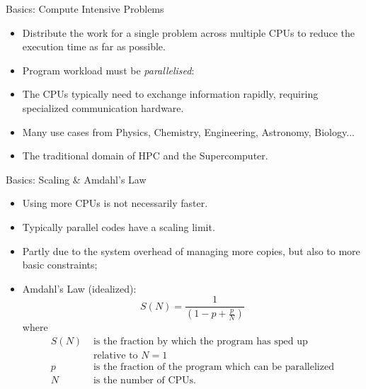 \begin{frame}{Basics: Compute Intensive Problems}
\begin{itemize}
\item{Distribute the \alert{work} for a \alert{single problem} across multiple CPUs to reduce the execution time as far as possible.}
\pause
\item{Program workload must be \emph{parallelised}:}
\pause
\item{The CPUs typically need to exchange information rapidly, requiring specialized communication hardware.}
\pause
\item{Many use cases from Physics, Chemistry, Engineering, Astronomy, Biology...}
\item{The traditional domain of \alert{HPC} and the \alert{Supercomputer}.}
\end{itemize}
\end{frame}

\begin{frame}{Basics: Scaling \& Amdahl's Law}
\begin{itemize}
\item{\alert{Using more CPUs is not necessarily faster.}}
  \pause
\item{Typically parallel codes have a \alert{scaling limit}.}
\item{Partly due to the system overhead of managing more copies, but also to more basic constraints;}
\pause
\item{Amdahl's Law (idealized):}
\[
S(N)=\frac{1}{\left(1-p+\frac{p}{N}\right)}
\]
where \begin{align*}S(N)&\text{ is the fraction by which the program has sped up}\\&\text{ relative to $N=1$}\\
p&\text{ is the fraction of the program which can be parallelized}\\
N&\text{ is the number of CPUs.}
\end{align*}
\end{itemize}
\end{frame}

